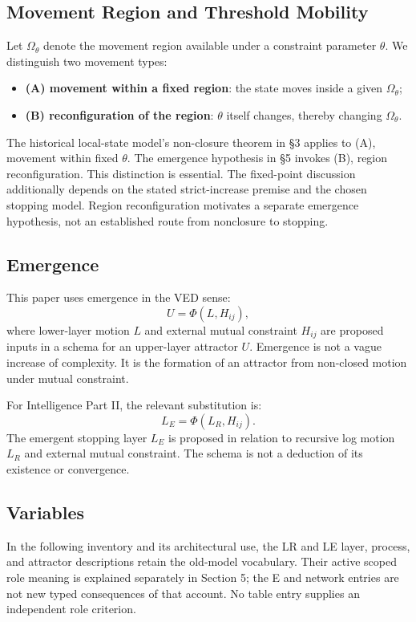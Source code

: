 \subsection{Movement Region and Threshold Mobility}

Let $\Omega_\theta$ denote the movement region available under a constraint parameter $\theta$. We distinguish two movement types:
\begin{itemize}
\item \textbf{(A) movement within a fixed region}: the state moves inside a given $\Omega_\theta$;
\item \textbf{(B) reconfiguration of the region}: $\theta$ itself changes, thereby changing $\Omega_\theta$.
\end{itemize}

The historical local-state model's non-closure theorem in \S{}3 applies to (A), movement within fixed $\theta$. The emergence hypothesis in \S{}5 invokes (B), region reconfiguration. This distinction is essential. The fixed-point discussion additionally depends on the stated strict-increase premise and the chosen stopping model. Region reconfiguration motivates a separate emergence hypothesis, not an established route from nonclosure to stopping.

\subsection{Emergence}

This paper uses emergence in the VED sense:
\[
U = \Phi(L,H_{ij}),
\]
where lower-layer motion $L$ and external mutual constraint $H_{ij}$ are proposed inputs in a schema for an upper-layer attractor $U$. Emergence is not a vague increase of complexity. It is the formation of an attractor from non-closed motion under mutual constraint.

For Intelligence Part II, the relevant substitution is:
\[
L_E = \Phi(L_R,H_{ij}).
\]
The emergent stopping layer $L_E$ is proposed in relation to recursive log motion $L_R$ and external mutual constraint. The schema is not a deduction of its existence or convergence.

\subsection{Variables}

In the following inventory and its architectural use, the LR and LE layer, process, and attractor descriptions retain the old-model vocabulary. Their active scoped role meaning is explained separately in Section 5; the E and network entries are not new typed consequences of that account. No table entry supplies an independent role criterion.

